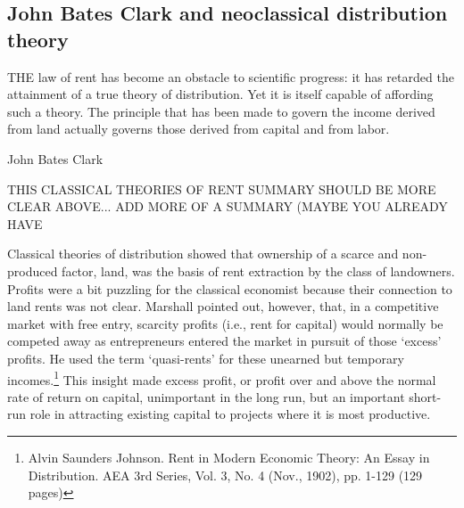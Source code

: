 

  \subsection{John Bates Clark and neoclassical distribution theory}
  \epigraph{THE law of rent has become an obstacle to scientific progress: it has retarded the attainment of a true theory of distribution. Yet it is itself capable of affording such a theory. The principle that has been made to govern the income derived from land actually governs those derived from capital and from labor. }{John Bates Clark \cite{clarkDistributionDeterminedLaw1891}}
  
  THIS CLASSICAL THEORIES OF RENT SUMMARY SHOULD BE MORE CLEAR ABOVE... ADD MORE OF A SUMMARY (MAYBE YOU ALREADY HAVE %
  
  Classical theories of distribution showed that ownership of a scarce and non-produced factor, land, was the  basis of rent extraction by the class of landowners. Profits were a bit puzzling for the classical economist because their connection to land rents was not clear. %
  Marshall %
   pointed out, however, that, in a competitive market with free entry, scarcity profits (i.e., rent for capital) would normally be competed away  as entrepreneurs entered the market in pursuit of those `excess' profits. He used the term `quasi-rents' for these unearned but temporary incomes.\footnote{Alvin Saunders Johnson. Rent in Modern Economic Theory: An Essay in Distribution. AEA 3rd Series, Vol. 3, No. 4 (Nov., 1902), pp. 1-129 (129 pages)} This insight made excess profit, or profit over and above the normal rate of return on capital, unimportant in the long run, but an important short-run role in attracting existing capital to projects where it is most productive. 

